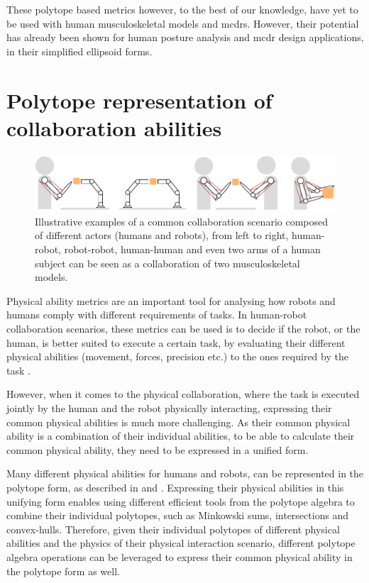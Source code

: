 These polytope based metrics however, to the best of our knowledge, have yet to be used with human musculoskeletal models and \glspl{mcdr}. However, their potential has already been shown for human posture analysis \cite{Inouye2016} and \gls{mcdr} design \cite{Ramadoss2021} applications, in their simplified ellipsoid forms.

\section{Polytope representation of collaboration abilities}
\label{ch:collab_metrics}

\begin{figure}[!h]
    \centering
    \includegraphics[width=\linewidth]{Chapters/imgs/collaboration.pdf}
    \caption{Illustrative examples of a common collaboration scenario composed of different actors (humans and robots), from left to right, human-robot, robot-robot, human-human and even two arms of a human subject can be seen as a collaboration of two musculoskeletal models.}
    \label{fig:collaboration_types}
\end{figure}

Physical ability metrics are an important tool for analysing how robots and humans comply with different requirements of tasks. In human-robot collaboration scenarios, these metrics can be used is to decide if the robot, or the human, is better suited to execute a certain task, by evaluating their different physical abilities (movement, forces, precision etc.) to the ones required by the task \cite{Edoardo2019Capability}. 

However, when it comes to the physical collaboration, where the task is executed jointly by the human and the robot physically interacting, expressing their common physical abilities is much more challenging. As their common physical ability is a combination of their individual abilities, to be able to calculate their common physical ability, they need to be expressed in a unified form.  

Many different physical abilities for humans and robots, can be represented in the polytope form, as described in  and . Expressing their physical abilities in this unifying form enables using different efficient tools from the polytope algebra to combine their individual polytopes, such as Minkowski sums, intersections and convex-hulls.
Therefore, given their individual polytopes of different physical abilities and the physics of their physical interaction scenario, different polytope algebra operations can be leveraged to express their common physical ability in the polytope form as well.

